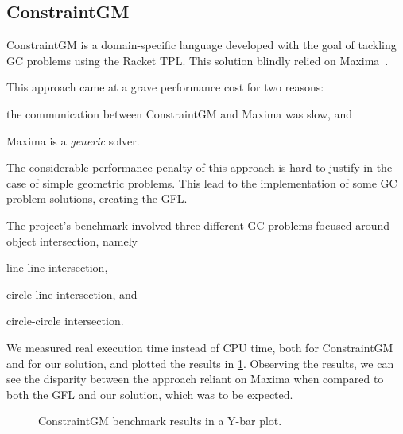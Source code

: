 \subsection{ConstraintGM}%
\label{sec:eval.cgm}

ConstraintGM is a domain-specific language developed with the goal of tackling
\ac{GC} problems using the Racket \ac{TPL}.  This solution blindly relied on
Maxima~\cite{Maxima:2021:Maxima}.

This approach came at a grave performance cost for two reasons:
\begin{enumerate*}[label= (\arabic*)]
  \item the communication between ConstraintGM and Maxima was slow, and
  \item Maxima is a \emph{generic} solver.
\end{enumerate*}
The considerable performance penalty of this approach is hard to justify in the
case of simple geometric problems. This lead to the implementation of some
\ac{GC} problem solutions, creating the \ac{GFL}.

The project's benchmark involved three different \ac{GC} problems focused around
object intersection, namely
\begin{enumerate*}[label= (\arabic*)]
  \item line-line intersection,
  \item circle-line intersection, and
  \item circle-circle intersection.
\end{enumerate*}

We measured real execution time instead of \ac{CPU} time, both for ConstraintGM
and for our solution, and plotted the results in \cref{fig:eval.cgm.perf}.
Observing the results, we can see the disparity between the approach reliant on
Maxima when compared to both the \ac{GFL} and our solution, which was to be
expected.

\begin{figure}[htb]
  \caption{\label{fig:eval.cgm.perf}%
    ConstraintGM benchmark results in a Y-bar plot.}
\end{figure}

